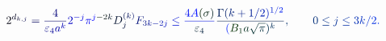 \documentclass[12pt]{article}
\begin{document}
\makeatletter
\renewcommand*{\@textcolor}[3]{%
  \protect\leavevmode
  \begingroup
    \color#1{#2}#3%
  \endgroup
}
\makeatother
\begin{displaymath}
\mathcolor[RGB]{0,0,15}{2} ^ { \mathcolor[RGB]{0,0,30}{d} _ { \mathcolor[RGB]{0,0,45}{k} \mathcolor[RGB]{0,0,60}{,} \mathcolor[RGB]{0,0,75}{j} } } \mathcolor[RGB]{0,0,90}{=} \mathcolor[RGB]{0,0,105}{\frac { \mathcolor[RGB]{0,0,120}{4} } { \mathcolor[RGB]{0,0,135}{\varepsilon} _ { \mathcolor[RGB]{0,0,150}{4} } \mathcolor[RGB]{0,0,165}{a} ^ { \mathcolor[RGB]{0,0,180}{k} } } } \mathcolor[RGB]{0,0,195}{2} ^ { \mathcolor[RGB]{0,0,210}{-} \mathcolor[RGB]{0,0,225}{j} } \mathcolor[RGB]{0,0,240}{\pi} ^ { \mathcolor[RGB]{0,0,255}{j} \mathcolor[RGB]{0,15,0}{-} \mathcolor[RGB]{0,15,15}{2} \mathcolor[RGB]{0,15,30}{k} } \mathcolor[RGB]{0,15,45}{D} _ { \mathcolor[RGB]{0,15,60}{j} } ^ { \mathcolor[RGB]{0,15,75}{(} \mathcolor[RGB]{0,15,90}{k} \mathcolor[RGB]{0,15,105}{)} } \mathcolor[RGB]{0,15,120}{F} _ { \mathcolor[RGB]{0,15,135}{3} \mathcolor[RGB]{0,15,150}{k} \mathcolor[RGB]{0,15,165}{-} \mathcolor[RGB]{0,15,180}{2} \mathcolor[RGB]{0,15,195}{j} } \mathcolor[RGB]{0,15,210}{\le} \mathcolor[RGB]{0,15,225}{\frac { \mathcolor[RGB]{0,15,240}{4} \mathcolor[RGB]{0,15,255}{A} \mathcolor[RGB]{0,30,0}{(} \mathcolor[RGB]{0,30,15}{\sigma} \mathcolor[RGB]{0,30,30}{)} } { \mathcolor[RGB]{0,30,45}{\varepsilon} _ { \mathcolor[RGB]{0,30,60}{4} } } } \mathcolor[RGB]{0,30,75}{\frac { \mathcolor[RGB]{0,30,90}{\Gamma} \mathcolor[RGB]{0,30,105}{(} \mathcolor[RGB]{0,30,120}{k} \mathcolor[RGB]{0,30,135}{+} \mathcolor[RGB]{0,30,150}{1} \mathcolor[RGB]{0,30,165}{/} \mathcolor[RGB]{0,30,180}{2} \mathcolor[RGB]{0,30,195}{)} ^ { \mathcolor[RGB]{0,30,210}{1} \mathcolor[RGB]{0,30,225}{/} \mathcolor[RGB]{0,30,240}{2} } } { \mathcolor[RGB]{0,30,255}{(} \mathcolor[RGB]{0,45,0}{B} _ { \mathcolor[RGB]{0,45,15}{1} } \mathcolor[RGB]{0,45,30}{a} \mathcolor[RGB]{0,45,45}{\sqrt { \mathcolor[RGB]{0,45,60}{\pi} } } \mathcolor[RGB]{0,45,75}{)} ^ { \mathcolor[RGB]{0,45,90}{k} } } } \mathcolor[RGB]{0,45,105}{,} \qquad \mathcolor[RGB]{0,45,120}{0} \mathcolor[RGB]{0,45,135}{\le} \mathcolor[RGB]{0,45,150}{j} \mathcolor[RGB]{0,45,165}{\le} \mathcolor[RGB]{0,45,180}{3} \mathcolor[RGB]{0,45,195}{k} \mathcolor[RGB]{0,45,210}{/} \mathcolor[RGB]{0,45,225}{2} \mathcolor[RGB]{0,45,240}{.}
\end{displaymath}
\end{document}
